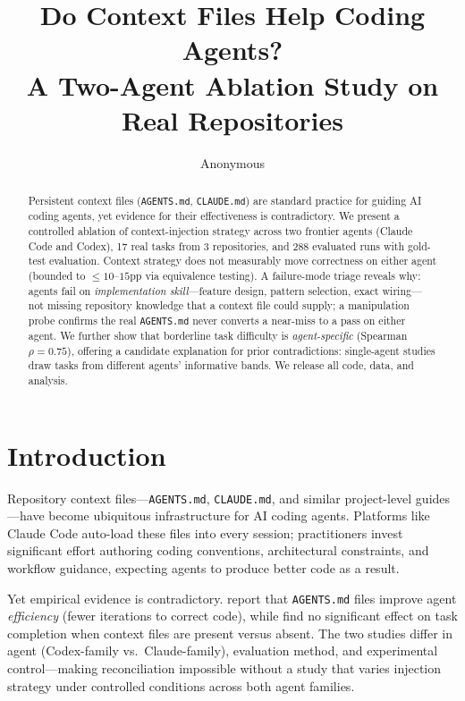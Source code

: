 \documentclass[11pt]{article}
\title{Do Context Files Help Coding Agents?\\A Two-Agent Ablation Study on Real Repositories}
\author{Anonymous}
\newcommand{\agentsmd}{\texttt{AGENTS.md}}
\begin{document}
\maketitle

\begin{abstract}
Persistent context files (\agentsmd{}, \texttt{CLAUDE.md}) are standard practice for guiding AI coding agents, yet evidence for their effectiveness is contradictory.
We present a controlled ablation of context-injection strategy across two frontier agents (Claude Code and Codex), 17 real tasks from 3 repositories, and 288 evaluated runs with gold-test evaluation.
Context strategy does not measurably move correctness on either agent (bounded to ${\leq}10$--$15$pp via equivalence testing).
A failure-mode triage reveals why: agents fail on \emph{implementation skill}---feature design, pattern selection, exact wiring---not missing repository knowledge that a context file could supply; a manipulation probe confirms the real \agentsmd{} never converts a near-miss to a pass on either agent.
We further show that borderline task difficulty is \emph{agent-specific} (Spearman $\rho{=}0.75$), offering a candidate explanation for prior contradictions: single-agent studies draw tasks from different agents' informative bands.
We release all code, data, and analysis.
\end{abstract}

\section{Introduction}

Repository context files---\agentsmd{}, \texttt{CLAUDE.md}, and similar project-level guides---have become ubiquitous infrastructure for AI coding agents.
Platforms like Claude Code auto-load these files into every session; practitioners invest significant effort authoring coding conventions, architectural constraints, and workflow guidance, expecting agents to produce better code as a result.

Yet empirical evidence is contradictory.
\citet{paper1} report that \agentsmd{} files improve agent \emph{efficiency} (fewer iterations to correct code), while \citet{paper2} find no significant effect on task completion when context files are present versus absent.
The two studies differ in agent (Codex-family vs.\ Claude-family), evaluation method, and experimental control---making reconciliation impossible without a study that varies injection strategy under controlled conditions across both agent families.
\end{document}
